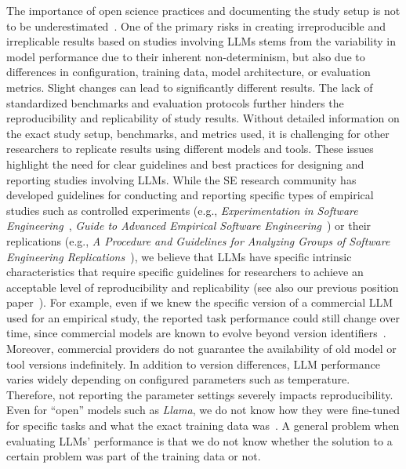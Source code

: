 The importance of open science practices and documenting the study setup is not to be underestimated~\cite{DBLP:journals/corr/abs-2412-17859}.
One of the primary risks in creating irreproducible and irreplicable results based on studies involving LLMs stems from the variability in model performance due to their inherent non-determinism, but also due to differences in configuration, training data, model architecture, or evaluation metrics.
Slight changes can lead to significantly different results.
The lack of standardized benchmarks and evaluation protocols further hinders the reproducibility and replicability of study results.
Without detailed information on the exact study setup, benchmarks, and metrics used, it is challenging for other researchers to replicate results using different models and tools.
These issues highlight the need for clear guidelines and best practices for designing and reporting studies involving LLMs.
While the SE research community has developed guidelines for conducting and reporting specific types of empirical studies such as controlled experiments (e.g., \emph{Experimentation in Software Engineering}~\cite{DBLP:books/sp/WohlinRHORW24}, \emph{Guide to Advanced Empirical Software Engineering}~\cite{DBLP:books/sp/08/SSS2008}) or their replications (e.g., \emph{A Procedure and Guidelines for Analyzing Groups of Software Engineering Replications}~\cite{DBLP:journals/tse/SantosVOJ21}),  we believe that LLMs have specific intrinsic characteristics that require specific guidelines for researchers to achieve an acceptable level of reproducibility and replicability (see also our previous position paper~\cite{DBLP:conf/wsese/0001BFB25}).
For example, even if we knew the specific version of a commercial LLM used for an empirical study, the reported task performance could still change over time, since commercial models are known to evolve beyond version identifiers~\cite{DBLP:journals/corr/abs-2307-09009}.
Moreover, commercial providers do not guarantee the availability of old model or tool versions indefinitely.
In addition to version differences, LLM performance varies widely depending on configured parameters such as temperature.
Therefore, not reporting the parameter settings severely impacts reproducibility.
Even for ``open'' models such as \emph{Llama}, we do not know how they were fine-tuned for specific tasks and what the exact training data was~\cite{Gibney2024}.
A general problem when evaluating LLMs' performance is that we do not know whether the solution to a certain problem was part of the training data or not.

